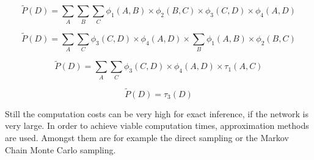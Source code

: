 \begin{equation}
\widetilde{P}(D)=\sum_A{\sum_B{\sum_C{\phi_1(A,B)\times\phi_2(B,C)\times\phi_3(C,D)\times\phi_4(A,D)}}}
\label{eq:fullsum}
\end{equation}

\begin{equation}
\widetilde{P}(D)=\sum_A{\sum_C{\phi_3(C,D)\times\phi_4(A,D)\times\sum_B{\phi_1(A,B)\times\phi_2(B,C)}}}
\label{eq:rightsum}
\end{equation}

\begin{equation}
\widetilde{P}(D)=\sum_A{\sum_C{\phi_3(C,D)\times\phi_4(A,D)\times\tau_1(A,C)}}
\label{eq:reducedsum}
\end{equation}

\begin{equation}
\widetilde{P}(D)=\tau_3(D)
\label{eq:endsum}
\end{equation}


Still the computation costs can be very high for exact inference, if the network is very large. In order to achieve viable computation times, approximation methods are used. Amongst them are for example the direct sampling or the Markov Chain Monte Carlo sampling. 




